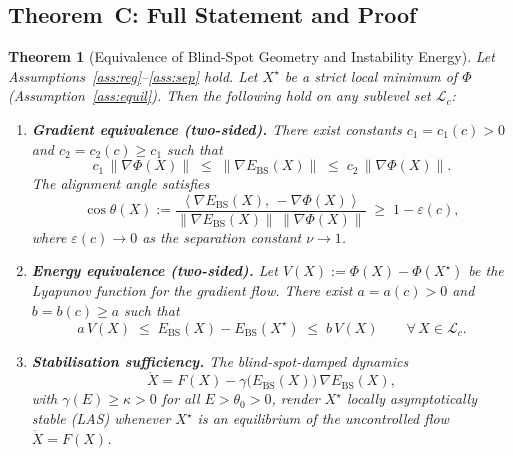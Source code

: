 \documentclass[11pt]{article}
\newtheorem{theorem}{Theorem}[section]
\theoremstyle{definition}
\newcommand{\Xst}{X^{\star}}
\newcommand{\grad}{\nabla}
\newcommand{\Ebs}{E_{\mathrm{BS}}}
\newcommand{\norm}[1]{\left\|#1\right\|}
\newcommand{\inner}[2]{\left\langle #1,\, #2\right\rangle}
\newcommand{\costheta}{\cos\theta}
\begin{document}
\subsection{Theorem~C: Full Statement and Proof}
\label{sec:equiv:thm}

\begin{theorem}[Equivalence of Blind-Spot Geometry and Instability Energy]
\label{thm:equiv}
Let Assumptions~\ref{ass:reg}--\ref{ass:sep} hold. Let $\Xst$ be a strict
local minimum of $\Phi$ (Assumption~\ref{ass:equil}).
Then the following hold on any sublevel set $\mathcal{L}_c$:

\begin{enumerate}
  \item[\textup{(C1)}] \textbf{Gradient equivalence (two-sided).}
    There exist constants $c_1 = c_1(c) > 0$ and $c_2 = c_2(c) \ge c_1$ such that
    \[
      c_1\,\norm{\grad\Phi(X)} \;\le\; \norm{\grad\Ebs(X)} \;\le\; c_2\,\norm{\grad\Phi(X)}.
    \]
    The alignment angle satisfies
    \[
      \costheta(X)
      := \frac{\inner{\grad\Ebs(X)}{-\grad\Phi(X)}}%
              {\norm{\grad\Ebs(X)}\,\norm{\grad\Phi(X)}}
      \;\ge\; 1 - \varepsilon(c),
    \]
    where $\varepsilon(c) \to 0$ as the separation constant $\nu \to 1$.

  \item[\textup{(C2)}] \textbf{Energy equivalence (two-sided).}
    Let $V(X) := \Phi(X) - \Phi(\Xst)$ be the Lyapunov function for the
    gradient flow. There exist $a = a(c) > 0$ and $b = b(c) \ge a$ such that
    \[
      a\,V(X) \;\le\; \Ebs(X) - \Ebs(\Xst) \;\le\; b\,V(X)
      \qquad \forall\, X \in \mathcal{L}_c.
    \]

  \item[\textup{(C3)}] \textbf{Stabilisation sufficiency.}
    The blind-spot-damped dynamics
    \begin{equation}
      \label{eq:bsdamped}
      \dot{X} = F(X) - \gamma\bigl(\Ebs(X)\bigr)\,\grad\Ebs(X),
    \end{equation}
    with $\gamma(E) \ge \kappa > 0$ for all $E > \theta_0 > 0$,
    render $\Xst$ \emph{locally asymptotically stable} (LAS) whenever
    $\Xst$ is an equilibrium of the uncontrolled flow $\dot{X}=F(X)$.
\end{enumerate}
\end{theorem}
\end{document}
